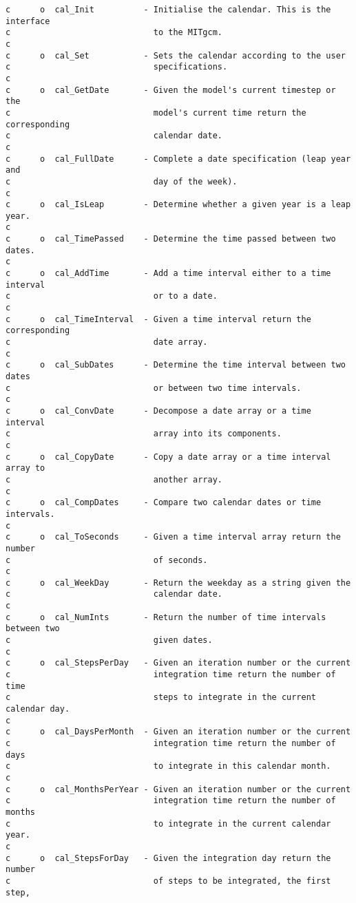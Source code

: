 {\footnotesize
\begin{verbatim}
c      o  cal_Init          - Initialise the calendar. This is the interface
c                             to the MITgcm.
c
c      o  cal_Set           - Sets the calendar according to the user
c                             specifications.
c
c      o  cal_GetDate       - Given the model's current timestep or the
c                             model's current time return the corresponding
c                             calendar date.
c
c      o  cal_FullDate      - Complete a date specification (leap year and
c                             day of the week).
c
c      o  cal_IsLeap        - Determine whether a given year is a leap year.
c
c      o  cal_TimePassed    - Determine the time passed between two dates.
c
c      o  cal_AddTime       - Add a time interval either to a time interval
c                             or to a date.
c
c      o  cal_TimeInterval  - Given a time interval return the corresponding
c                             date array.
c
c      o  cal_SubDates      - Determine the time interval between two dates
c                             or between two time intervals.
c
c      o  cal_ConvDate      - Decompose a date array or a time interval
c                             array into its components.
c
c      o  cal_CopyDate      - Copy a date array or a time interval array to
c                             another array.
c
c      o  cal_CompDates     - Compare two calendar dates or time intervals. 
c
c      o  cal_ToSeconds     - Given a time interval array return the number
c                             of seconds.
c
c      o  cal_WeekDay       - Return the weekday as a string given the
c                             calendar date.
c
c      o  cal_NumInts       - Return the number of time intervals between two
c                             given dates.
c
c      o  cal_StepsPerDay   - Given an iteration number or the current
c                             integration time return the number of time
c                             steps to integrate in the current calendar day.
c
c      o  cal_DaysPerMonth  - Given an iteration number or the current
c                             integration time return the number of days
c                             to integrate in this calendar month.
c
c      o  cal_MonthsPerYear - Given an iteration number or the current
c                             integration time return the number of months
c                             to integrate in the current calendar year.
c
c      o  cal_StepsForDay   - Given the integration day return the number
c                             of steps to be integrated, the first step,

\end{verbatim}}
